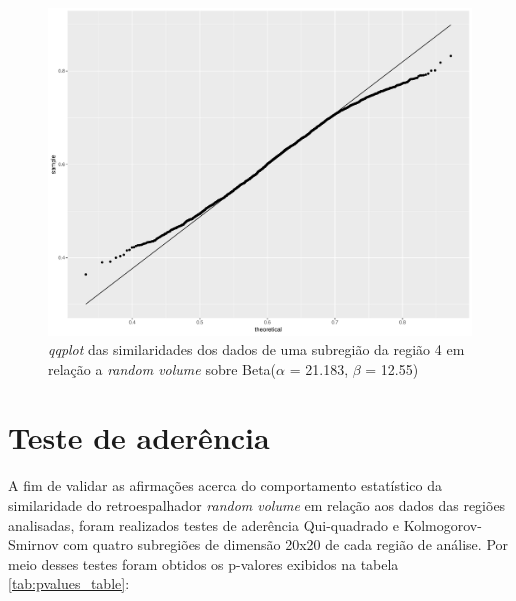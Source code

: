 \documentclass[12pt]{article}
\begin{document}
\begin{figure}[!h]

  \centering
  \includegraphics[width=0.8\linewidth]{../../Figures/Report_19_02_27/qqplot_region4_2.pdf}
  \caption{\textit{qqplot} das similaridades dos dados de uma subregião da região 4 em relação a \textit{random volume} sobre Beta($\alpha$ = 21.183, $\beta$ = 12.55)}
  \label{fig:qqplot_sub_rv4.2}

\end{figure}


\section{Teste de aderência}

A fim de validar as afirmações acerca do comportamento estatístico da similaridade do retroespalhador \textit{random volume} em relação aos dados das regiões analisadas, foram realizados testes de aderência Qui-quadrado e Kolmogorov-Smirnov com quatro subregiões de dimensão 20x20 de cada região de análise. Por meio desses testes foram obtidos os p-valores exibidos na tabela \ref{tab:pvalues_table}:
\end{document}
